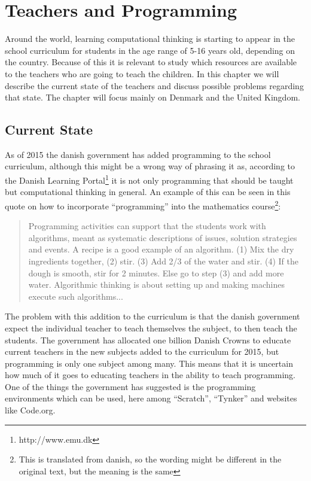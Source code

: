\chapter{Teachers and Programming}
\label{chap:teaching}
Around the world, learning computational thinking is starting to appear in the school curriculum for students in the age range of 5-16 years old, depending on the country. Because of this it is relevant to study which resources are available to the teachers who are going to teach the children. In this chapter we will describe the current state of the teachers and discuss possible problems regarding that state. The chapter will focus mainly on Denmark and the United Kingdom.

\section{Current State}
As of 2015 the danish government has added programming to the school curriculum, although this might be a wrong way of phrasing it as, according to the Danish Learning Portal\footnote{http://www.emu.dk} it is not only programming that should be taught but computational thinking in general. An example of this can be seen in this quote on how to incorporate ``programming'' into the mathematics course\footnote{This is translated from danish, so the wording might be different in the original text, but the meaning is the same}:
\begin{quote}
Programming activities can support that the students work with algorithms, meant as systematic descriptions of issues, solution strategies and events. A recipe is a good example of an algorithm. (1) Mix the dry ingredients together, (2) stir. (3) Add 2/3 of the water and stir. (4) If the dough is smooth, stir for 2 minutes. Else go to step (3) and add more water. Algorithmic thinking is about setting up and making machines execute such algorithms...\cite{dk_scratch}
\end{quote}

The problem with this addition to the curriculum is that the danish government expect the individual teacher to teach themselves the subject, to then teach the students. The government has allocated one billion Danish Crowns to educate current teachers in the new subjects added to the curriculum for 2015, but programming is only one subject among many. This means that it is uncertain how much of it goes to educating teachers in the ability to teach programming. One of the things the government has suggested is the programming environments which can be used, here among ``Scratch'', ``Tynker'' and websites like Code.org.

